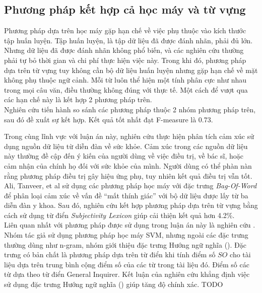 \subsection{Phương pháp kết hợp cả học máy và từ vựng}
Phương pháp dựa trên học máy gặp hạn chế về việc phụ thuộc vào kích thước tập huấn luyện. Tập huấn luyện, là tập dữ liệu đã được đánh nhãn, phải đủ lớn. Nhưng dữ liệu đã được đánh nhãn không phổ biến, và các nghiên cứu thường phải tự bỏ thời gian và chi phí thực hiện việc này. Trong khi đó, phương pháp dựa trên từ vựng tuy không cần bộ dữ liệu huấn luyện nhưng gặp hạn chế về mặt không phụ thuộc ngữ cảnh. Mỗi từ luôn thể hiện một tính phân cực như nhau trong mọi câu văn, điều thường không đúng với thực tế. Một cách để vượt qua các hạn chế này là kết hợp 2 phương pháp trên.\\

Nghiên cứu \cite{gonccalves2013comparing} tiến hành so sánh các phương pháp thuộc 2 nhóm phương pháp trên, sau đó đề xuất sự kết hợp. Kết quả tốt nhất đạt F-measure là 0.73. 

Trong cùng lĩnh vực với luận án này, nghiên cứu \cite{ali2013can} thực hiện phân tích cảm xúc sử dụng nguồn dữ liệu từ diễn đàn về sức khỏe. Cảm xúc trong các nguồn dữ liệu này thường đề cập đến ý kiến của người dùng về việc điều trị, về bác sĩ, hoặc cảm nhận của chính họ đối với sức khỏe của mình. Người dùng có thể phàn nàn rằng phương pháp điều trị gây hiệu ứng phụ, tuy nhiên kết quả điều trị vẫn tốt. Ali, Tanveer, et al \cite{ali2013can} sử dụng các phương pháp học máy với đặc trưng \textit{Bag-Of-Word} để phân loại cảm xúc về vấn đề ``mất thính giác'' với bộ dữ liệu được lấy từ ba diễn đàn y khoa\footnotemark. Sau đó, nghiên cứu kết hợp phương pháp dựa trên từ vựng bằng cách sử dụng từ điển \textit{Subjectivity Lexicon} giúp cải thiện kết quả hơn 4.2\%. \\

Liên quan nhất với phương pháp được sử dụng trong luận án này là nghiên cứu \cite{sarker2011outcome}. Nhóm tác giả sử dụng phương pháp học máy SVM, nhưng ngoài các đặc trưng thường dùng như n-gram, nhóm giới thiệu đặc trưng Hướng ngữ nghĩa (). Đặc trưng có bản chất là phương pháp dựa trên từ điển khi tính điểm số $SO$ cho tài liệu dựa trên trung bình cộng điểm số của các từ trong tài liệu đó. Điểm số các từ dựa theo từ điển General Inquirer. Kết luận của nghiên cứu khẳng định việc sử dụng đặc trưng Hướng ngữ nghĩa () giúp tăng độ chính xác.
TODO  \cite{Zhang2011}